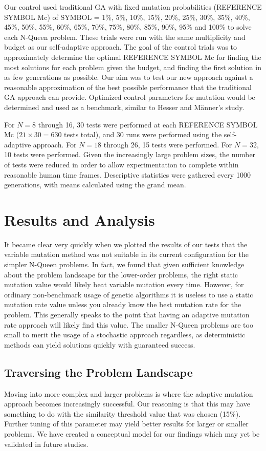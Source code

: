 \documentclass[conference]{IEEEtran}
\begin{document}
Our control used traditional GA with fixed mutation probabilities ({REFERENCE SYMBOL Mc}) of {SYMBOL} = 1\%, 5\%, 10\%, 15\%, 20\%, 25\%, 30\%, 35\%, 40\%, 45\%, 50\%, 55\%, 60\%, 65\%, 70\%, 75\%, 80\%, 85\%, 90\%, 95\% and 100\% to solve each N-Queen problem. These trials were run with the same multiplicity and budget as our self-adaptive approach. The goal of the control trials was to approximately determine the optimal {REFERENCE SYMBOL Mc} for finding the most solutions for each problem given the budget, and finding the first solution in as few generations as possible. Our aim was to test our new approach against a reasonable approximation of the best possible performance that the traditional GA approach can provide. Optimized control parameters for mutation would be determined and used as a benchmark, similar to Hesser and M\"{a}nner's study.

For $N = 8$ through 16, 30 tests were performed at each {REFERENCE SYMBOL Mc} ($21 \times 30 = 630$ tests total), and 30 runs were performed using the self-adaptive approach. For $N = 18$ through 26, 15 tests were performed. For $N = 32$, 10 tests were performed. Given the increasingly large problem sizes, the number of tests were reduced in order to allow experimentation to complete within reasonable human time frames. Descriptive statistics were gathered every 1000 generations, with means calculated using the grand mean.

\section{Results and Analysis}
It became clear very quickly when we plotted the results of our tests that the variable mutation method was not suitable in its current configuration for the simpler N-Queen problems. In fact, we found that given sufficient knowledge about the problem landscape for the lower-order problems, the right static mutation value would likely beat variable mutation every time. However, for ordinary non-benchmark usage of genetic algorithms it is useless to use a static mutation rate value unless you already know the best mutation rate for the problem. This generally speaks to the point that having an adaptive mutation rate approach will likely find this value. The smaller N-Queen problems are too small to merit the usage of a stochastic approach regardless, as deterministic methods can yield solutions quickly with guaranteed success.

\subsection{Traversing the Problem Landscape}
Moving into more complex and larger problems is where the adaptive mutation approach becomes increasingly successful. Our reasoning is that this may have something to do with the similarity threshold value that was chosen (15\%). Further tuning of this parameter may yield better results for larger or smaller problems. We have created a conceptual model for our findings which may yet be validated in future studies.
\end{document}
